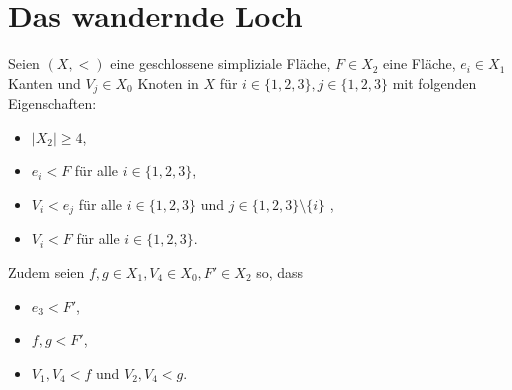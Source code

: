 \documentclass[12pt,titlepage]{article}
\begin{document}
\section{Das wandernde Loch}\label{kwh}
 Seien $(X,<)$ eine geschlossene simpliziale Fläche, $F \in X_{2}$ eine Fläche, $e_{i} \in X_{1}$ Kanten und $V_{j} \in X_{0}$ Knoten in $X$ für $i \in \{1,2,3\},j \in \{1,2,3\}$ mit folgenden Eigenschaften:
 \begin{itemize}
 \item $\vert X_{2}\vert \geq 4$,
 \item $e_{i} < F$ für alle $i \in \{1,2,3\}$,
 \item $V_{i}<e_{j}$ für alle $i \in \{1,2,3\}$ und $j \in \{1,2,3\} \setminus\{i\}$ ,
 \item $V_{i} < F$ für alle $i \in \{1,2,3\}$.
\end{itemize}  
Zudem seien $f,g \in X_1,V_4 \in X_0,F' \in X_2$ so, dass
\begin{itemize}
\item $e_3<F'$,
\item $f,g <F'$, 
\item $V_1,V_4<f$ und $V_2,V_4<g$.
\end{itemize}
\end{document}

